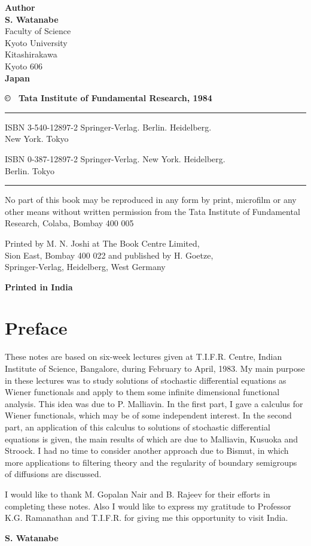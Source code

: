 \thispagestyle{empty}
\begin{center}
{\bf Author}\\[15pt]
{\large\bf S. Watanabe}\\
{Faculty of Science}\\
{Kyoto University}\\
{Kitashirakawa}\\
{Kyoto 606}\\
{\bf Japan}

\vfill

{\large\bf \copyright~ Tata Institute of Fundamental Research, 1984}\\

\vfill

\rule{\textwidth}{.5pt}

{ISBN 3-540-12897-2 Springer-Verlag. Berlin. Heidelberg.\\ New York. Tokyo} 

{ISBN 0-387-12897-2 Springer-Verlag. New  York. Heidelberg.\\ Berlin. Tokyo}

\rule{\textwidth}{.5pt}

\vfill

\parbox{0.7\textwidth}{
No part of this book may be reproduced in any form
by print, microfilm or any other means without
written permission from the Tata Institute of
Fundamental Research, Colaba, Bombay 400 005}

\vfill

Printed by M. N. Joshi at The Book Centre Limited,\\
Sion East, Bombay 400 022 and published by H. Goetze,\\
Springer-Verlag, Heidelberg, West Germany\\

\bigskip

{\bf Printed in India}

\end{center}

\eject

\thispagestyle{empty}

\chapter*{Preface}

These notes are based on six-week lectures given at T.I.F.R. Centre,
Indian Institute of Science, Bangalore, during February to April,
1983. My main purpose in these lectures was to study solutions of
stochastic differential equations as Wiener functionals and apply to
them some infinite dimensional functional analysis. This idea was due
to P. Malliavin. In the first part, I gave a calculus for Wiener
functionals, which may be of some independent interest. In the second
part, an application of this calculus to solutions of stochastic
differential equations is given, the main results of which are due to
Malliavin, Kusuoka and Stroock. I had no time to consider another
approach due to Bismut, in which more applications to filtering theory
and the regularity of boundary semigroups of diffusions are
discussed. 

\medskip

I would like to thank M. Gopalan Nair and B. Rajeev for their efforts
in completing these notes. Also I would like to express my gratitude
to Professor K.G. Ramanathan and T.I.F.R. for giving me this
opportunity to visit India. 
\vskip 1cm

\hfill{\large\bf S. Watanabe}

